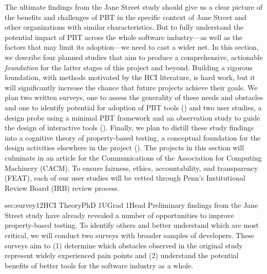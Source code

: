The ultimate findings from the Jane Street study should
give us a clear
picture of the benefits and challenges of PBT in the specific context
of Jane Street and other organizations with similar characteristics.  But to
fully understand the potential impact of PBT across the whole software
industry---as well as the factors that may limit its adoption---we need to
cast a wider net.
%
In this section, we describe four planned studies that aim
to produce a comprehensive, actionable
{\em foundation} for the latter stages of this project and beyond. Building a
rigorous foundation, with methods motivated by the HCI literature, is hard work,
but it will significantly increase the chance that future projects achieve their goals.
We plan two
written surveys, one to assess the generality of these needs and obstacles
and one to identify potential for adoption of PBT tools
() and two user studies, a design probe using a minimal
PBT framework
and an observation study
to guide the design of
interactive tools
(). Finally, we plan to distill these
study findings into a cognitive
theory of property-based testing, a conceptual foundation for the
design activities elsewhere in the project ().
The projects in this section will culminate in an article for the Communications
of the Association for Computing Machinery (CACM).
%
To ensure fairness, ethics, accountability, and transparency (FEAT),
each of our user studies will be vetted through Penn's Institutional
Review Board (IRB) review process.

%
   {sec:survey}{1}{2}{HCI Theory}{PhD 1}{UGrad 1}{Head}
%
Preliminary findings from the Jane Street study have already revealed
a number of
opportunities to improve property-based testing. To identify
others and better understand which are most
critical, we will conduct two
surveys with broader samples of developers. These surveys aim to
(1) determine which obstacles observed in the original
study
represent widely experienced pain points and
(2) understand the potential benefits of better tools for the
software industry as a whole.

